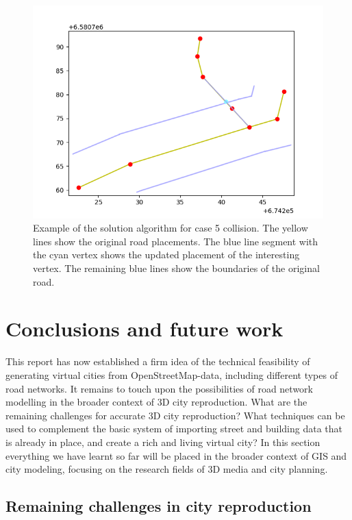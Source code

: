 \documentclass{kththesis}
\begin{document}
\begin{figure}[H]
    \centering
    \includegraphics[width=\textwidth,height=0.5\textheight,keepaspectratio]{img_feature_overlap_fix_4}
    \caption{Example of the solution algorithm for case 5 collision. The yellow lines show the original road placements. The blue line segment with the cyan vertex shows the updated placement of the interesting vertex. The remaining blue lines show the boundaries of the original road.}
    \label{fig:collision-case-5}
\end{figure}

\chapter{Conclusions and future work}

This report has now established a firm idea of the technical feasibility of generating virtual cities from OpenStreetMap-data, including different types of road networks.
It remains to touch upon the possibilities of road network modelling in the broader context of 3D city reproduction. What are the remaining challenges for accurate 3D city reproduction?
What techniques can be used to complement the basic system of importing street and building data that is already in place, and create a rich and living virtual city?
In this section everything we have learnt so far will be placed in the broader context of GIS and city modeling, focusing on the research fields of 3D media and city planning.

\section{Remaining challenges in city reproduction}
\end{document}

